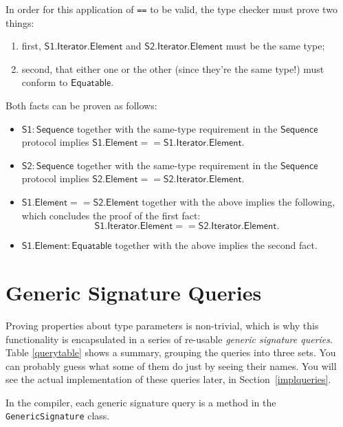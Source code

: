 \documentclass[headsepline,bibliography=totoc]{scrreport}
\newcommand{\namesym}[1]{\mathsf{#1}}
\newcommand{\genericparam}[1]{\bm{\mathsf{#1}}}
\newcommand{\proto}[1]{\bm{\mathsf{#1}}}
\theoremstyle{definition}
\theoremstyle{definition}
\theoremstyle{definition}
\begin{document}
In order for this application of \texttt{==} to be valid, the type checker must prove two things:
\begin{enumerate}
\item first, $\genericparam{S1}.\namesym{Iterator}.\namesym{Element}$ and $\genericparam{S2}.\namesym{Iterator}.\namesym{Element}$ must be the same type;
\item second, that either one or the other (since they're the same type!) must conform to $\proto{Equatable}$.
\end{enumerate}
Both facts can be proven as follows:
\begin{itemize}
\item $\genericparam{S1}\colon\proto{Sequence}$ together with the same-type requirement in the $\proto{Sequence}$ protocol implies $\genericparam{S1}.\namesym{Element}==\genericparam{S1}.\namesym{Iterator}.\namesym{Element}$.
\item $\genericparam{S2}\colon\proto{Sequence}$ together with the same-type requirement in the $\proto{Sequence}$ protocol implies $\genericparam{S2}.\namesym{Element}==\genericparam{S2}.\namesym{Iterator}.\namesym{Element}$.
\item $\genericparam{S1}.\namesym{Element}==\genericparam{S2}.\namesym{Element}$ together with the above implies the following, which concludes the proof of the first fact:
\[\genericparam{S1}.\namesym{Iterator}.\namesym{Element}==\genericparam{S2}.\namesym{Iterator}.\namesym{Element}.\] 
\item $\genericparam{S1}.\namesym{Element}\colon\proto{Equatable}$ together with the above implies the second fact.
\end{itemize}

\section{Generic Signature Queries}\label{intqueries}

Proving properties about type parameters is non-trivial, which is why this functionality is encapsulated in a series of re-usable \emph{generic signature queries}.
Table \ref{querytable} shows a summary, grouping the queries into three sets. You can probably guess what some of them do just by seeing their names. You will see the actual implementation of these queries later, in Section~\ref{implqueries}.
\begin{leftbar}
\noindent In the compiler, each generic signature query is a method in the \texttt{GenericSignature} class.
\end{leftbar}
\end{document}
